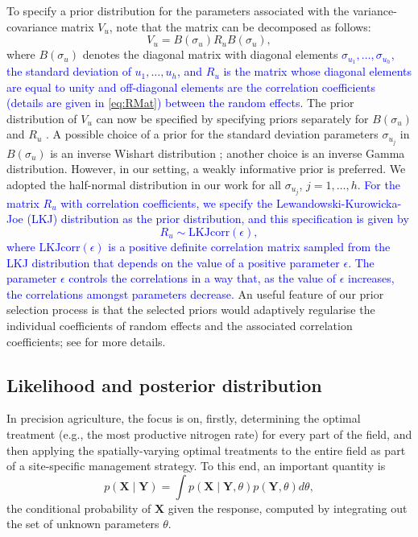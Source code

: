 \documentclass[a4paper]{article}   	%
\begin{document}
	To specify a prior distribution for the parameters associated with the variance-covariance matrix $V_u$, note that the matrix can be decomposed as follows:
	\begin{equation}\label{eq:varmat}
		V_u = B(\sigma_u)R_u B(\sigma_u),
	\end{equation}
	where $B(\sigma_u)$ denotes the diagonal matrix with diagonal elements \textcolor{blue}{$\sigma_{u_1},\ldots,\sigma_{u_h}$, the standard deviation of $u_1,\ldots,u_h$, and $R_u$ is the matrix whose diagonal elements are equal to unity and off-diagonal elements are the correlation coefficients (details are given in \eqref{eq:RMat}) between the random effects}. The prior distribution of $V_u$ can now be specified by specifying priors separately for $B(\sigma_u)$ and $R_u$ \parencite{McElreath2015Statistical}. A possible choice of a prior for the standard deviation parameters $\sigma_{u_j}$ in $B(\sigma_u)$ is an inverse Wishart distribution \parencite{Kass2006Default}; another choice is an inverse Gamma distribution. However, in our setting, a weakly informative prior is preferred. We adopted the half-normal distribution in our work for all $\sigma_{u_j}$, $j=1,\ldots,h$. \textcolor{blue}{For the matrix $R_u$ with correlation coefficients, we specify the Lewandowski-Kurowicka-Joe (LKJ) distribution \parencite{Lewandowski2009Generating} as the prior distribution, and this specification is given by
	\begin{equation}\label{eq:RPrior}
		R_u \sim \text{LKJcorr}(\epsilon),
	\end{equation}
	where $\text{LKJcorr}(\epsilon)$ is a positive definite correlation matrix sampled from the LKJ distribution that depends on the value of a positive parameter $\epsilon$. The parameter $\epsilon$ controls the correlations in a way that, as the value of $\epsilon$ increases, the correlations amongst parameters decrease.} An useful feature of our prior selection process is that the selected priors would adaptively regularise the individual coefficients of random effects and the associated correlation coefficients; see \textcite{gelman2017Prior, gabry2019Visualization} for more details. 
	
	
	\subsection{Likelihood and posterior distribution}
	
	In precision agriculture, the focus is on, firstly, determining the optimal treatment (e.g., the most productive nitrogen rate) for every part of the field, and then applying the spatially-varying optimal treatments to the entire field as part of a site-specific management strategy. To this end, an important quantity is 
	\begin{equation}
		p(\bm{X}\mid \bm{Y}) = \int p(\bm{X}\mid \bm{Y},\theta)p(\bm{Y},\theta)d\theta,
	\end{equation}
	the conditional probability of $\bm{X}$ given the response, computed by integrating out the set of unknown parameters $\theta$. 
	
\end{document}
